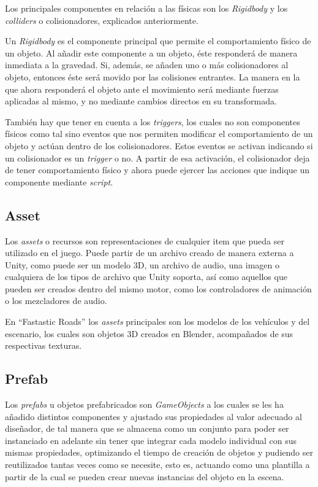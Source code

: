 Los principales componentes en relación a las físicas son los \textit{Rigidbody} y los \textit{colliders} o colisionadores, explicados anteriormente. 

Un \textit{Rigidbody} es el componente principal que permite el comportamiento físico de un objeto. Al añadir este componente a un objeto, éste responderá de manera inmediata a la gravedad. Si, además, se añaden uno o más colisionadores al objeto, entonces éste será movido por las colisiones entrantes. La manera en la que ahora responderá el objeto ante el movimiento será mediante fuerzas aplicadas al mismo, y no mediante cambios directos en su transformada.

También hay que tener en cuenta a los \textit{triggers}, los cuales no son componentes físicos como tal sino eventos que nos permiten modificar el comportamiento de un objeto y actúan dentro de los colisionadores. Estos eventos se activan indicando si un colisionador es un \textit{trigger} o no. A partir de esa activación, el colisionador deja de tener comportamiento físico y ahora puede ejercer las acciones que indique un componente mediante \textit{script}.

\subsection{Asset}

Los \textit{assets} o recursos son representaciones de cualquier item que pueda ser utilizado en el juego. Puede partir de un archivo creado de manera externa a Unity, como puede ser un modelo 3D, un archivo de audio, una imagen o cualquiera de los tipos de archivo que Unity soporta, así como aquellos que pueden ser creados dentro del mismo motor, como los controladores de animación o los mezcladores de audio.

En ``Fastastic Roads'' los \textit{assets} principales son los modelos de los vehículos y del escenario, los cuales son objetos 3D creados en Blender, acompañados de sus respectivas texturas.

\subsection{Prefab}

Los \textit{prefabs} u objetos prefabricados son \textit{GameObjects} a los cuales se les ha añadido distintos componentes y ajustado sus propiedades al valor adecuado al diseñador, de tal manera que se almacena como un conjunto para poder ser instanciado en adelante sin tener que integrar cada modelo individual con sus mismas propiedades, optimizando el tiempo de creación de objetos y pudiendo ser reutilizados tantas veces como se necesite, esto es, actuando como una plantilla a partir de la cual se pueden crear nuevas instancias del objeto en la escena.

